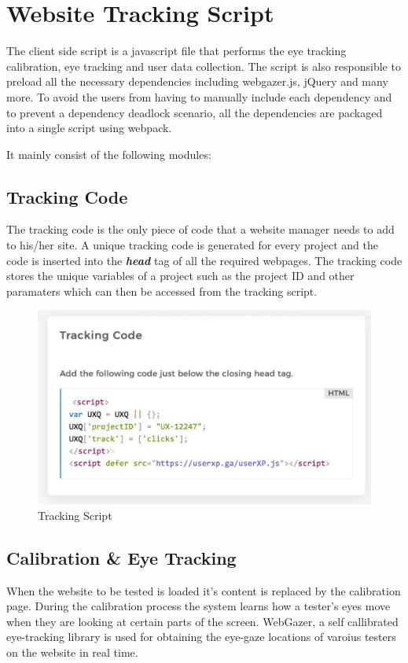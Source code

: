 \documentclass[hidelinks,12pt,a4paper,final]{extreport}
\begin{document}
\section{Website Tracking Script}
The client side script is a javascript file that performs the eye tracking calibration, eye tracking and user data collection. The script is also responsible to preload all the necessary dependencies including webgazer.js, jQuery and many more. To avoid the users from having to manually include each dependency and to prevent a dependency deadlock scenario, all the dependencies are packaged into a single script using webpack.

It mainly consist of the following modules:
\subsection{Tracking Code}
The tracking code is the only piece of code that a website manager needs to add to his/her site. A unique tracking code is generated for every project and the code is inserted into the \textbf{\textit{head}} tag of all the required webpages. The tracking code stores the unique variables of a project such as the project ID and other paramaters which can then be accessed from the tracking script.
\begin{figure}[H]
    \centering
    \includegraphics[width=\linewidth]{tracking-script.png}
    \caption{Tracking Script}
\end{figure}

\subsection{Calibration \& Eye Tracking}
When the website to be tested is loaded it's content is replaced by the calibration page. During the calibration process the system learns how a tester’s eyes move when they are looking at certain parts of the screen.
WebGazer, a self callibrated eye-tracking library is used for obtaining the eye-gaze locations of varoius testers on the website in real time.
\end{document}
